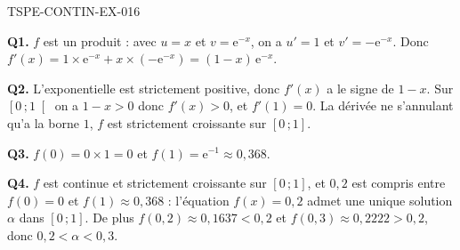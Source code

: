 \begin{corrige}{TSPE-CONTIN-EX-016}

\textbf{Q1.} $f$ est un produit : avec $u = x$ et $v = \mathrm{e}^{-x}$, on a $u' = 1$ et $v' = -\mathrm{e}^{-x}$. Donc $f'(x) = 1\times\mathrm{e}^{-x} + x\times(-\mathrm{e}^{-x}) = (1-x)\,\mathrm{e}^{-x}$.

\textbf{Q2.} L'exponentielle est strictement positive, donc $f'(x)$ a le signe de $1-x$. Sur $\left[0\,;1\right[$ on a $1-x > 0$ donc $f'(x) > 0$, et $f'(1) = 0$. La dérivée ne s'annulant qu'a la borne $1$, $f$ est strictement croissante sur $[0\,;1]$.

\textbf{Q3.} $f(0) = 0 \times 1 = 0$ et $f(1) = \mathrm{e}^{-1} \approx 0{,}368$.

\textbf{Q4.} $f$ est continue et strictement croissante sur $[0\,;1]$, et $0{,}2$ est compris entre $f(0) = 0$ et $f(1) \approx 0{,}368$ : l'équation $f(x) = 0{,}2$ admet une unique solution $\alpha$ dans $[0\,;1]$. De plus $f(0{,}2) \approx 0{,}1637 < 0{,}2$ et $f(0{,}3) \approx 0{,}2222 > 0{,}2$, donc $0{,}2 < \alpha < 0{,}3$.
\end{corrige}
